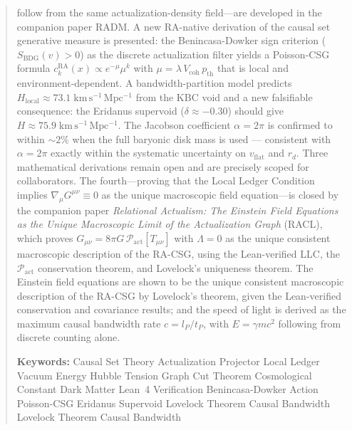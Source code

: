 \documentclass[11pt,a4paper]{article}
\theoremstyle{plain}
\theoremstyle{definition}
\theoremstyle{remark}
\begin{document}
\begin{titlepage}
\begin{abstract}
follow from the same actualization-density field---are developed in the companion
paper RADM. A new RA-native derivation of the
causal set generative measure is presented: the Benincasa-Dowker sign
criterion ($S_{\mathrm{BDG}}(v) > 0$) as the discrete actualization
filter yields a Poisson-CSG formula $c_k^{\mathrm{RA}}(x) \propto
e^{-\mu}\mu^k$ with $\mu = \lambda\,V_{\mathrm{coh}}\,p_{\mathrm{th}}$
that is local and environment-dependent. A bandwidth-partition model
predicts $H_{\mathrm{local}} \approx 73.1\;\mathrm{km\,s^{-1}\,Mpc^{-1}}$
from the KBC void and a new falsifiable consequence: the Eridanus
supervoid ($\delta \approx -0.30$) should give $H \approx
75.9\;\mathrm{km\,s^{-1}\,Mpc^{-1}}$. The Jacobson coefficient
$\alpha = 2\pi$ is confirmed to within ${\sim}2\%$ when the full
baryonic disk mass is used --- consistent
with $\alpha = 2\pi$ exactly within the systematic uncertainty on
$v_{\mathrm{flat}}$ and $r_d$. Three mathematical derivations remain open and are precisely scoped for collaborators.
The fourth---proving that the Local Ledger Condition implies
$\nabla_\mu G^{\mu\nu} \equiv 0$ as the unique macroscopic field equation---is
closed by the companion paper \emph{Relational Actualism: The Einstein Field
Equations as the Unique Macroscopic Limit of the Actualization Graph}
(RACL), which proves $G_{\mu\nu} = 8\pi G\,
\mathcal{P}_{\mathrm{act}}[T_{\mu\nu}]$ with $\Lambda = 0$ as the unique
consistent macroscopic description of the RA-CSG, using the Lean-verified
LLC, the $\mathcal{P}_{\mathrm{act}}$ conservation theorem, and Lovelock's
uniqueness theorem.
The Einstein field equations are shown to be the unique consistent
macroscopic description of the RA-CSG by Lovelock's theorem, given
the Lean-verified conservation and covariance results; and the speed
of light is derived as the maximum causal bandwidth rate $c = l_P/t_P$,
with $E = \gamma mc^2$ following from discrete counting alone.

\medskip\noindent
\textbf{Keywords:} Causal Set Theory \textperiodcentered{} Actualization Projector
\textperiodcentered{} Local Ledger \textperiodcentered{} Vacuum Energy
\textperiodcentered{} Hubble Tension \textperiodcentered{} Graph Cut Theorem
\textperiodcentered{} Cosmological Constant \textperiodcentered{} Dark Matter \textperiodcentered{} Lean~4 Verification \textperiodcentered{} Benincasa-Dowker Action \textperiodcentered{} Poisson-CSG \textperiodcentered{} Eridanus Supervoid \textperiodcentered{} Lovelock Theorem \textperiodcentered{} Causal Bandwidth \textperiodcentered{} Lovelock Theorem \textperiodcentered{} Causal Bandwidth
\end{abstract}
\end{titlepage}
\end{document}
